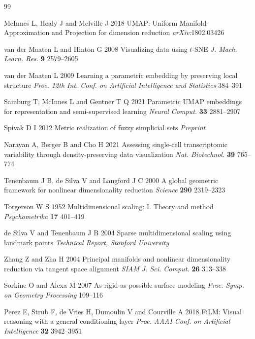 \documentclass[12pt]{iopart}
\theoremstyle{definition}
\theoremstyle{plain}
\theoremstyle{remark}
\begin{document}
\begin{thebibliography}{99}

McInnes L, Healy J and Melville J 2018
UMAP: Uniform Manifold Approximation and Projection for dimension reduction
\emph{arXiv:}1802.03426

van der Maaten L and Hinton G 2008
Visualizing data using $t$-SNE
\emph{J. Mach. Learn. Res.} \textbf{9} 2579--2605

van der Maaten L 2009
Learning a parametric embedding by preserving local structure
\emph{Proc. 12th Int. Conf. on Artificial Intelligence and Statistics}
384--391

Sainburg T, McInnes L and Gentner T Q 2021
Parametric UMAP embeddings for representation and semi-supervised learning
\emph{Neural Comput.} \textbf{33} 2881--2907

Spivak D I 2012
Metric realization of fuzzy simplicial sets
\emph{Preprint}

Narayan A, Berger B and Cho H 2021
Assessing single-cell transcriptomic variability through density-preserving
data visualization
\emph{Nat. Biotechnol.} \textbf{39} 765--774

Tenenbaum J B, de Silva V and Langford J C 2000
A global geometric framework for nonlinear dimensionality reduction
\emph{Science} \textbf{290} 2319--2323

Torgerson W S 1952
Multidimensional scaling: I. Theory and method
\emph{Psychometrika} \textbf{17} 401--419

de Silva V and Tenenbaum J B 2004
Sparse multidimensional scaling using landmark points
\emph{Technical Report, Stanford University}

Zhang Z and Zha H 2004
Principal manifolds and nonlinear dimensionality reduction via tangent space
alignment
\emph{SIAM J. Sci. Comput.} \textbf{26} 313--338

Sorkine O and Alexa M 2007
As-rigid-as-possible surface modeling
\emph{Proc. Symp. on Geometry Processing} 109--116

Perez E, Strub F, de Vries H, Dumoulin V and Courville A 2018
FiLM: Visual reasoning with a general conditioning layer
\emph{Proc. AAAI Conf. on Artificial Intelligence} \textbf{32} 3942--3951


\end{thebibliography}
\end{document}
